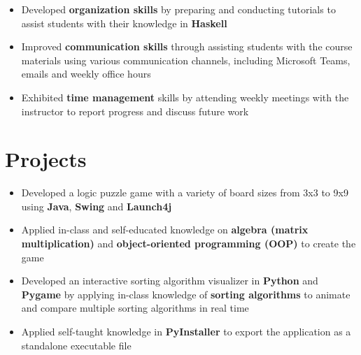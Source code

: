 \documentclass[12pt,letterpaper,sans]{moderncv}        %
\begin{document}
\vspace{1.0em}

\begin{itemize}
  \item Developed \textbf{organization skills} by preparing and conducting tutorials to assist students with their knowledge in \textbf{Haskell}
  \item Improved \textbf{communication skills} through assisting students with the course materials using various communication channels, including Microsoft Teams, emails and weekly office hours
  \item Exhibited \textbf{time management} skills by attending weekly meetings with the instructor to report progress and discuss future work
\end{itemize}


\vspace{-0.25em}


\section{Projects}
\begin{itemize}
  \item Developed a logic puzzle game with a variety of board sizes from 3x3 to 9x9 using \textbf{Java}, \textbf{Swing} and \textbf{Launch4j}
  \item Applied in-class and self-educated knowledge on \textbf{algebra (matrix multiplication)} and \textbf{object-oriented programming (OOP)} to create the game
\end{itemize}

\vspace{0.25cm}

\begin{itemize}
  \item Developed an interactive sorting algorithm visualizer in \textbf{Python} and \textbf{Pygame} by applying in-class knowledge of \textbf{sorting algorithms} to animate and compare multiple sorting algorithms in real time
  \item Applied self-taught knowledge in \textbf{PyInstaller} to export the application as a standalone executable file
\end{itemize}
\end{document}
